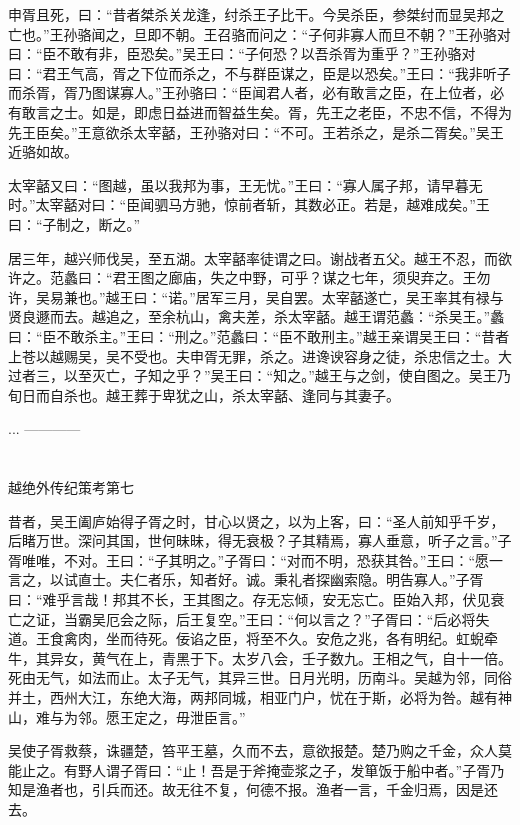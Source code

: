 \documentclass[12pt,UTF8]{ctexbook}
\begin{document}
申胥且死，曰：“昔者桀杀关龙逢，纣杀王子比干。今吴杀臣，参桀纣而显吴邦之亡也。”王孙骆闻之，旦即不朝。王召骆而问之：“子何非寡人而旦不朝？”王孙骆对曰：“臣不敢有非，臣恐矣。”吴王曰：“子何恐？以吾杀胥为重乎？”王孙骆对曰：“君王气高，胥之下位而杀之，不与群臣谋之，臣是以恐矣。”王曰：“我非听子而杀胥，胥乃图谋寡人。”王孙骆曰：“臣闻君人者，必有敢言之臣，在上位者，必有敢言之士。如是，即虑日益进而智益生矣。胥，先王之老臣，不忠不信，不得为先王臣矣。”王意欲杀太宰嚭，王孙骆对曰：“不可。王若杀之，是杀二胥矣。”吴王近骆如故。

太宰嚭又曰：“图越，虽以我邦为事，王无忧。”王曰：“寡人属子邦，请早暮无时。”太宰嚭对曰：“臣闻驷马方驰，惊前者斩，其数必正。若是，越难成矣。”王曰：“子制之，断之。”

居三年，越兴师伐吴，至五湖。太宰嚭率徒谓之曰。谢战者五父。越王不忍，而欲许之。范蠡曰：“君王图之廊庙，失之中野，可乎？谋之七年，须臾弃之。王勿许，吴易兼也。”越王曰：“诺。”居军三月，吴自罢。太宰嚭遂亡，吴王率其有禄与贤良遯而去。越追之，至余杭山，禽夫差，杀太宰嚭。越王谓范蠡：“杀吴王。”蠡曰：“臣不敢杀主。”王曰：“刑之。”范蠡曰：“臣不敢刑主。”越王亲谓吴王曰：“昔者上苍以越赐吴，吴不受也。夫申胥无罪，杀之。进谗谀容身之徒，杀忠信之士。大过者三，以至灭亡，子知之乎？”吴王曰：“知之。”越王与之剑，使自图之。吴王乃旬日而自杀也。越王葬于卑犹之山，杀太宰嚭、逢同与其妻子。

...
------------

\part{}

越绝外传纪策考第七

昔者，吴王阖庐始得子胥之时，甘心以贤之，以为上客，曰：“圣人前知乎千岁，后睹万世。深问其国，世何昧昧，得无衰极？子其精焉，寡人垂意，听子之言。”子胥唯唯，不对。王曰：“子其明之。”子胥曰：“对而不明，恐获其咎。”王曰：“愿一言之，以试直士。夫仁者乐，知者好。诚。秉礼者探幽索隐。明告寡人。”子胥曰：“难乎言哉！邦其不长，王其图之。存无忘倾，安无忘亡。臣始入邦，伏见衰亡之证，当霸吴厄会之际，后王复空。”王曰：“何以言之？”子胥曰：“后必将失道。王食禽肉，坐而待死。佞谄之臣，将至不久。安危之兆，各有明纪。虹蜺牵牛，其异女，黄气在上，青黑于下。太岁八会，壬子数九。王相之气，自十一倍。死由无气，如法而止。太子无气，其异三世。日月光明，历南斗。吴越为邻，同俗并土，西州大江，东绝大海，两邦同城，相亚门户，忧在于斯，必将为咎。越有神山，难与为邻。愿王定之，毋泄臣言。”

吴使子胥救蔡，诛疆楚，笞平王墓，久而不去，意欲报楚。楚乃购之千金，众人莫能止之。有野人谓子胥曰：“止！吾是于斧掩壶浆之子，发箪饭于船中者。”子胥乃知是渔者也，引兵而还。故无往不复，何德不报。渔者一言，千金归焉，因是还去。
\end{document}

